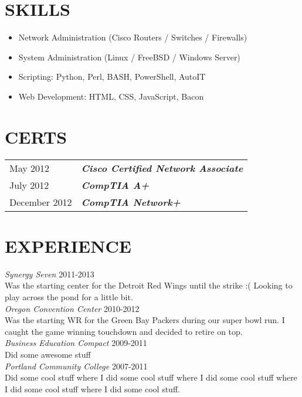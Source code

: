 \documentclass[line, margin]{res}
\begin{document}
\address{123 Sherman Blvd \\ Milwaukie, OR 97027 \\ (503) 432-6325}
 
\begin{resume}
 
\section{SKILLS}
\begin{itemize}
\item Network Administration (Cisco Routers / Switches / Firewalls)
\item System Administration (Linux / FreeBSD / Windows Server)
\item Scripting: Python, Perl, BASH, PowerShell, AutoIT
\item Web Development: HTML, CSS, JavaScript, Bacon
\end{itemize}

\section{CERTS}
\begin{tabular}{l l}
May 2012 & \textbf{\textit{Cisco Certified Network Associate}} \\ [5pt]
July 2012 & \textbf{\textit{CompTIA A+}} \\ [5pt]
December 2012 & \textbf{\textit{CompTIA Network+}} \\
\end{tabular}

\section{EXPERIENCE} 
\textit{Synergy Seven} \hfill 2011-2013 \\
Was the starting center for the Detroit Red Wings until the strike :( Looking to play across the pond for a little bit. \\ [10pt]
\textit{Oregon Convention Center} \hfill 2010-2012 \\
Was the starting WR for the Green Bay Packers during our super bowl run. I caught the game winning touchdown and decided to retire on top. \\ [10pt]
\textit{Business Education Compact} \hfill 2009-2011 \\
Did some awesome stuff \\ [10pt]
\textit{Portland Community College} \hfill2007-2011 \\
Did some cool stuff where I did some cool stuff where I did some cool stuff where I did some cool stuff where I did some cool stuff.



\end{resume}
\end{document}

